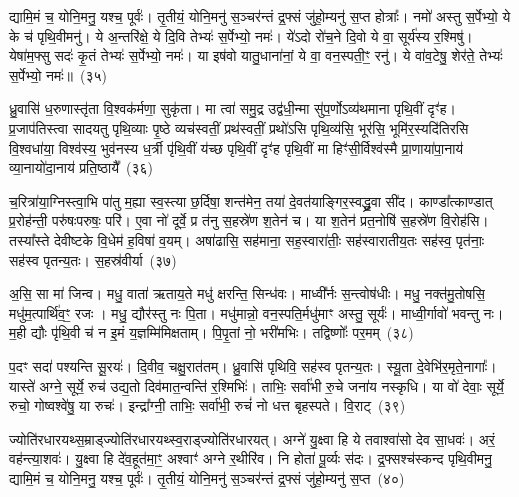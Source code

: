 द्यामि॒मं च॒ योनि॒मनु॒ यश्च॒ पूर्वः॑। तृ॒तीयं॒ योनि॒मनु॑ स॒ञ्चर॑न्तं द्र॒फ्सं जु॑हो॒म्यनु॑ स॒प्त होत्राः᳚। नमो॑ अस्तु स॒र्पेभ्यो॒ ये के च॑ पृथि॒वीमनु॑। ये अ॒न्तरि॑क्षे॒ ये दि॒वि तेभ्यः॑ स॒र्पेभ्यो॒ नमः॑। ये॑\-ऽदो रो॑च॒ने दि॒वो ये वा॒ सूर्य॑स्य र॒श्मिषु॑। येषा॑म॒फ्सु सदः॑ कृ॒तं तेभ्यः॑ स॒र्पेभ्यो॒ नमः॑। या इष॑वो यातु॒धाना॑नां॒ ये वा॒ वन॒स्पती॒ꣳ॒ रनु॑। ये वा॑व॒टेषु॒ शेर॑ते॒ तेभ्यः॑ स॒र्पेभ्यो॒ नमः॑॥~(३५)

{\anuvakamend[{म॒हो\-ऽनु॑ यातु॒धाना॑ना॒मेका॑\-दश च}]}%

ध्रु॒वासि॑ ध॒रुणास्तृ॑ता वि॒श्वक॑र्मणा॒ सुकृ॑ता। मा त्वा॑ समु॒द्र उद्व॑धी॒न्मा सु॑प॒र्णो\-ऽव्य॑थमाना पृथि॒वीं दृꣳ॑ह। प्र॒जा\-प॑तिस्त्वा सादयतु पृथि॒व्याः पृ॒ष्ठे व्यच॑स्वतीं॒ प्रथ॑स्वतीं॒ प्रथो॑\-ऽसि पृथि॒व्य॑सि॒ भूर॑सि॒ भूमि॑र॒स्यदि॑तिरसि वि॒श्वधा॑या॒ विश्व॑स्य॒ भुव॑नस्य ध॒र्त्री पृ॑थि॒वीं य॑च्छ पृथि॒वीं दृꣳ॑ह पृथि॒वीं मा हिꣳ॑सी॒र्विश्व॑स्मै प्रा॒णाया॑पा॒नाय॑ व्या॒नायो॑दा॒नाय॑ प्रति॒ष्ठायै᳚~(३६)

च॒रित्रा॑या॒ग्निस्त्वा॒भि पा॑तु म॒ह्या स्व॒स्त्या छ॒र्दिषा॒ शन्त॑मेन॒ तया॑ दे॒वत॑याङ्गिर॒स्वद्ध्रु॒वा सी॑द। काण्डा᳚त्काण्डात् प्र॒रोह॑न्ती॒ परु॑षःपरुषः॒ परि॑। ए॒वा नो॑ दूर्वे॒ प्र त॑नु स॒हस्रे॑ण श॒तेन॑ च। या श॒तेन॑ प्रत॒नोषि॑ स॒हस्रे॑ण वि॒रोह॑सि। तस्या᳚स्ते देवीष्टके वि॒धेम॑ ह॒विषा॑ व॒यम्। अषा॑ढासि॒ सह॑माना॒ सह॒स्वारा॑तीः॒ सह॑स्वारातीय॒तः सह॑स्व॒ पृत॑नाः॒ सह॑स्व पृतन्य॒तः। स॒हस्र॑वीर्या~(३७)

अ॒सि॒ सा मा॑ जिन्व। मधु॒ वाता॑ ऋताय॒ते मधु॑ क्षरन्ति॒ सिन्ध॑वः। माध्वी᳚र्नः स॒न्त्वोष॑धीः। मधु॒ नक्त॑मु॒तोषसि॒ मधु॑म॒त्पार्थि॑व॒ꣳ॒ रजः। मधु॒ द्यौर॑स्तु नः पि॒ता। मधु॑मान्नो॒ वन॒स्पति॒र्मधु॑माꣳ अस्तु॒ सूर्यः॑। माध्वी॒र्गावो॑ भवन्तु नः। म॒ही द्यौः पृ॑थि॒वी च॑ न इ॒मं य॒ज्ञम्मि॑मिक्षताम्। पि॒पृ॒तां नो॒ भरी॑मभिः। तद्विष्णोः᳚ पर॒मम्~(३८)

प॒दꣳ सदा॑ पश्यन्ति सू॒रयः॑। दि॒वीव॒ चक्षु॒रात॑तम्। ध्रु॒वासि॑ पृथिवि॒ सह॑स्व पृतन्य॒तः। स्यू॒ता दे॒वेभि॑र॒मृते॒नागाः᳚। यास्ते॑ अग्ने॒ सूर्ये॒ रुच॑ उद्य॒तो दिव॑मात॒न्वन्ति॑ र॒श्मिभिः॑। ताभिः॒ सर्वा॑भी रु॒चे जना॑य नस्कृधि। या वो॑ देवाः॒ सूर्ये॒ रुचो॒ गोष्वश्वे॑षु॒ या रुचः॑। इन्द्रा᳚ग्नी॒ ताभिः॒ सर्वा॑भी॒ रुचं॑ नो धत्त बृहस्पते। वि॒राट्~(३९)

ज्योति॑रधारयथ्स॒म्राड्ज्योति॑रधारयथ्स्व॒राड्ज्योति॑रधारयत्। अग्ने॑ यु॒क्ष्वा हि ये तवाश्वा॑सो देव सा॒धवः॑। अरं॒ वह॑न्त्या॒शवः॑। यु॒क्ष्वा हि दे॑व॒हूत॑मा॒ꣳ॒ अश्वाꣳ॑ अग्ने र॒थीरि॑व। नि होता॑ पू॒र्व्यः स॑दः। द्र॒फ्सश्च॑स्कन्द पृथि॒वीमनु॒ द्यामि॒मं च॒ योनि॒मनु॒ यश्च॒ पूर्वः॑। तृ॒तीयं॒ योनि॒मनु॑ स॒ञ्चर॑न्तं द्र॒फ्सं जु॑हो॒म्यनु॑ स॒प्त~(४०)

